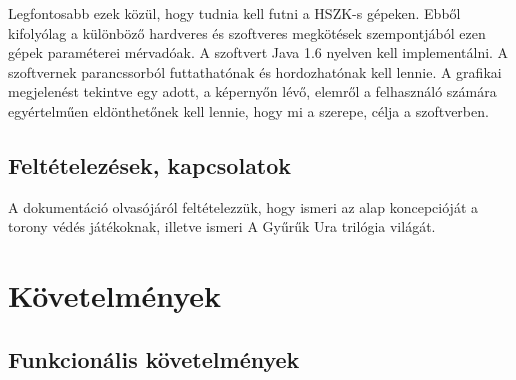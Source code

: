 Legfontosabb ezek közül, hogy tudnia kell futni a HSZK-s gépeken.  Ebből kifolyólag a különböző hardveres és szoftveres megkötések szempontjából ezen gépek paraméterei mérvadóak. A szoftvert Java 1.6 nyelven kell implementálni. A szoftvernek parancssorból futtathatónak és hordozhatónak kell lennie. A grafikai megjelenést tekintve egy adott, a képernyőn lévő, elemről a felhasználó számára egyértelműen eldönthetőnek kell lennie, hogy mi a szerepe, célja a szoftverben. 



\subsection{Feltételezések, kapcsolatok}

A dokumentáció olvasójáról feltételezzük, hogy ismeri az alap koncepcióját a torony védés játékoknak, illetve ismeri A Gyűrűk Ura trilógia világát.


\section{Követelmények}
\subsection{Funkcionális követelmények}



